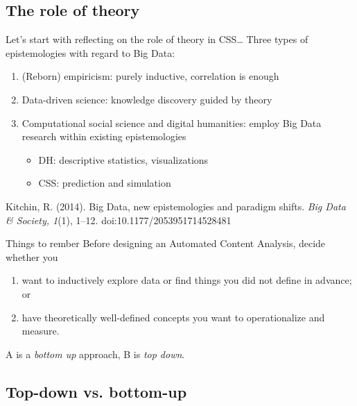\documentclass{beamer}
\begin{document}
\subsection{The role of theory}




\begin{frame}{Let's start with reflecting on the role of theory in CSS\ldots}
Three types of epistemologies with regard to Big Data:
\begin{enumerate}
	\item<+-> (Reborn) empiricism: purely inductive, correlation is enough
	\item<+-> Data-driven science: knowledge discovery guided by theory
	\item<+->Computational social science and digital humanities: employ Big Data research within existing epistemologies
	\begin{itemize}
		\item DH: descriptive statistics, visualizations
		\item CSS: prediction and simulation
	\end{itemize}
\end{enumerate}

\tiny
Kitchin, R. (2014). Big Data, new epistemologies and paradigm shifts.\textit{ Big Data \& Society, 1}(1), 1–12. doi:10.1177/2053951714528481


\end{frame}


\begin{frame}[plain]
	\begin{alertblock}{Things to rember}
Before designing an Automated Content Analysis, decide whether you 
\begin{enumerate}[A]
	\item want to inductively explore data or find things you did not define in advance; \\ or
	\item have theoretically well-defined concepts you want to operationalize and measure.
\end{enumerate}
\end{alertblock}
\pause
A is a \textit{bottom up} approach, B is \textit{top down}.
\end{frame}


\subsection{Top-down vs. bottom-up}
\end{document}
